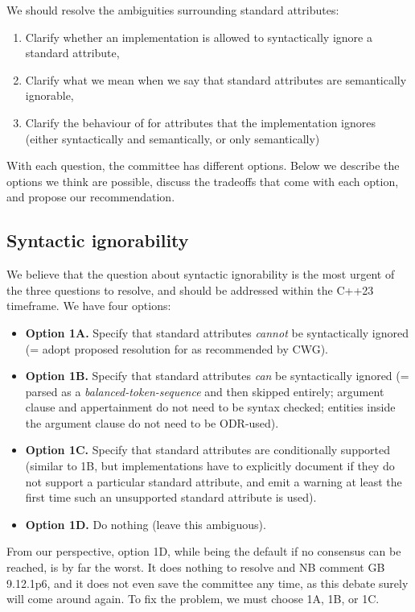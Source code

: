 We should resolve the ambiguities surrounding standard attributes:

\begin{enumerate}
\item Clarify whether an implementation is allowed to syntactically ignore a standard attribute,
\item Clarify what we mean when we say that standard attributes are semantically ignorable,
\item Clarify the behaviour of  for attributes that the implementation ignores (either syntactically and semantically, or only semantically)
\end{enumerate}

With each question, the committee has different options. Below we describe the options we think are possible, discuss the tradeoffs that come with each option, and propose our recommendation.

\subsection{Syntactic ignorability}

We believe that the question about syntactic ignorability is the most urgent of the three questions to resolve, and should be addressed within the C++23 timeframe. We have four options:

\begin{itemize}
\item \textbf{Option 1A.} Specify that standard attributes \emph{cannot} be syntactically ignored (= adopt proposed resolution for \cite{CWG2538} as recommended by CWG).
\item \textbf{Option 1B.} Specify that standard attributes \emph{can} be syntactically ignored (= parsed as a \emph{balanced-token-sequence} and then skipped entirely; argument clause and appertainment do not need to be syntax checked; entities inside the argument clause do not need to be ODR-used).
\item \textbf{Option 1C.} Specify that standard attributes are conditionally supported (similar to 1B, but implementations have to explicitly document if they do not support a particular standard attribute, and emit a warning at least the first time such an unsupported standard attribute is used).
\item \textbf{Option 1D.} Do nothing (leave this ambiguous).
\end{itemize}

From our perspective, option 1D, while being the default if no consensus can be reached, is by far the worst. It does nothing to resolve \cite{CWG2538} and NB comment GB 9.12.1p6, and it does not even save the committee any time, as this debate surely will come around again. To fix the problem, we must choose 1A, 1B, or 1C.

